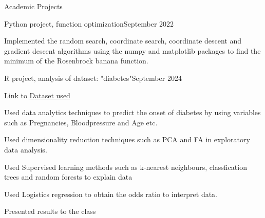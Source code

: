 \documentclass[
	11pt, %
]{resume} %
\begin{document}
\begin{rSection}{Academic Projects}

	\begin{rSubsection}{Python project, function optimization}{September 2022}{}{}
		\item Implemented the random search, coordinate search, coordinate descent and gradient descent algorithms using the numpy and matplotlib packages to find the minimum of the Rosenbrock banana function.
	\end{rSubsection}




	\begin{rSubsection}{R project, analysis of dataset: "diabetes"}{September 2024}{}{}
		\item Link to \href{https://www.kaggle.com/datasets/mathchi/diabetes-data-set}{Dataset used}
		\item Used data analytics techniques to predict the onset of diabetes by using variables such as Pregnancies, Bloodpressure and Age etc. 
		\item Used dimensionality reduction techniques such as PCA and FA in exploratory data analysis.
		\item Used Supervised learning methods such as k-nearest neighbours, classfication trees and random forests to explain data
		\item Used Logistics regression to obtain the odds ratio to interpret data.
		\item Presented results to the class


\end{rSubsection}
\end{rSection}
\end{document}

